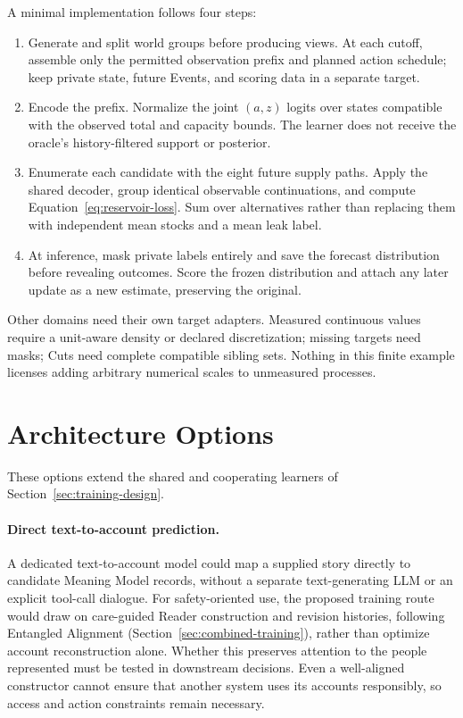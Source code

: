 \documentclass[10pt]{article}
\begin{document}
A minimal implementation follows four steps:
\begin{enumerate}
 \item Generate and split world groups before producing views. At each cutoff,
   assemble only the permitted observation prefix and planned action schedule;
   keep private state, future Events, and scoring data in a separate target.
 \item Encode the prefix. Normalize the joint $(a,z)$ logits over states
   compatible with the observed total and capacity bounds. The learner does
   not receive the oracle's history-filtered support or posterior.
 \item Enumerate each candidate with the eight future supply paths. Apply
   the shared decoder, group identical observable continuations, and compute
   Equation~\ref{eq:reservoir-loss}. Sum over alternatives rather than replacing
   them with independent mean stocks and a mean leak label.
 \item At inference, mask private labels entirely and save the forecast
   distribution before revealing outcomes. Score the frozen distribution and
   attach any later update as a new estimate, preserving the original.
\end{enumerate}
Other domains need their own target adapters. Measured continuous values
require a unit-aware density or declared discretization; missing targets need
masks; Cuts need complete compatible sibling sets. Nothing in this finite
example licenses adding arbitrary numerical scales to unmeasured processes.

\section{Architecture Options}
\label{app:architecture-options}

These options extend the shared and cooperating learners of
Section~\ref{sec:training-design}.

\paragraph{Direct text-to-account prediction.}
A dedicated text-to-account model could map a supplied story directly to
candidate Meaning Model records, without a separate text-generating LLM or an
explicit tool-call dialogue. For safety-oriented use, the proposed training
route would draw on care-guided Reader construction and revision histories,
following Entangled Alignment (Section~\ref{sec:combined-training}), rather
than optimize account reconstruction alone. Whether this preserves attention
to the people represented must be tested in downstream decisions. Even a
well-aligned constructor cannot ensure that another system uses its accounts
responsibly, so access and action constraints remain necessary.
\end{document}
